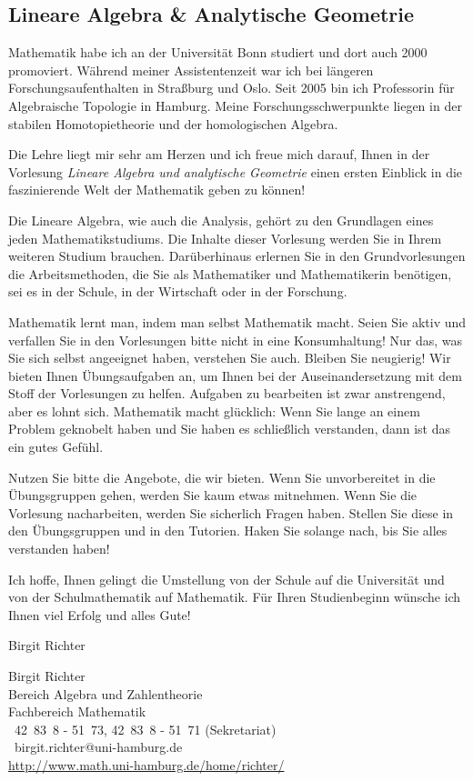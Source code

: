 
\subsection{Lineare Algebra \& Analytische Geometrie}

Mathematik habe ich an der Universit\"at Bonn studiert und dort auch 2000
promoviert. W\"ahrend meiner Assistentenzeit war ich bei l\"angeren
Forschungsaufent\-halten in Stra{\ss}burg und Oslo. Seit 2005 bin ich
Professorin f\"ur Algebraische Topologie in Hamburg. Meine
Forschungsschwerpunkte liegen in der stabilen Homoto\-pie\-theorie und der
homologischen Algebra.

Die Lehre liegt mir sehr am Herzen und ich freue mich darauf, Ihnen in der
Vorlesung \emph{Lineare Algebra und analytische Geometrie} einen ersten
Einblick in die faszinierende Welt der Mathematik geben zu k\"onnen!

Die Lineare Algebra, wie auch die Analysis, geh\"ort zu den Grundlagen eines
jeden Mathematikstudiums. Die Inhalte dieser Vorlesung werden Sie in Ihrem
weiteren Studium brauchen. Dar\"uberhinaus erlernen Sie in den Grundvorlesungen
die Arbeitsmethoden, die Sie als Mathematiker und Mathematikerin ben\"otigen,
sei es in der Schule, in der Wirtschaft oder in der Forschung. 

Mathematik lernt man, indem man selbst Mathematik macht. Seien Sie aktiv und
verfallen Sie in den Vorlesungen bitte nicht in eine Konsumhaltung!  Nur das,
was Sie sich selbst angeeignet haben, verstehen Sie auch. Bleiben Sie
neugierig! Wir bieten Ihnen \"Ubungsaufgaben an, um Ihnen bei der
Auseinandersetzung mit dem Stoff der Vorlesungen zu helfen. Aufgaben zu
bearbeiten ist zwar anstrengend, aber es lohnt sich.  Mathematik macht
gl\"ucklich: Wenn Sie lange an einem Problem geknobelt haben und Sie haben es
schlie{\ss}lich verstanden, dann ist das ein gutes Gef\"uhl. 

Nutzen Sie bitte die Angebote, die wir bieten. Wenn Sie unvorbereitet in die
\"Ubungsgruppen gehen, werden Sie kaum etwas mitnehmen. Wenn Sie die Vorlesung
nacharbeiten, werden Sie sicherlich Fragen haben. Stellen Sie diese in den
\"Ubungsgruppen und in den Tutorien. Haken Sie solange nach, bis Sie alles
verstanden haben! 

Ich hoffe, Ihnen gelingt die Umstellung von der Schule auf die Universit\"at
und von der Schulmathematik auf Mathematik.   F\"ur Ihren Studienbeginn
w\"unsche ich Ihnen viel Erfolg und alles Gute!

\bigskip

\hfill Birgit Richter

Birgit Richter \\
Bereich Algebra und Zahlentheorie\\
Fachbereich Mathematik\\
\Telefon\ 42~83~8 - 51~73, 42~83~8 - 51~71 (Sekretariat) \\
\Letter\ birgit.richter@uni-hamburg.de\\
\url{http://www.math.uni-hamburg.de/home/richter/}
